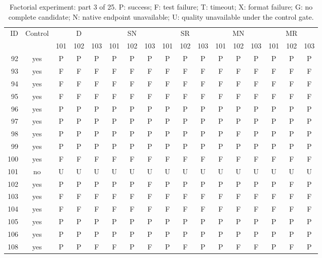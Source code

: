 \begin{table}[p]\centering\footnotesize
\setlength{\tabcolsep}{3pt}
\caption{Factorial experiment: part 3 of 25. P: success; F: test failure; T: timeout; X: format failure; G: no complete candidate; N: native endpoint unavailable; U: quality unavailable under the control gate.}
\begin{tabular*}{\textwidth}{@{\extracolsep{\fill}}rcccccccccccccccc}\toprule
ID & Control & \multicolumn{3}{c}{D} & \multicolumn{3}{c}{SN} & \multicolumn{3}{c}{SR} & \multicolumn{3}{c}{MN} & \multicolumn{3}{c}{MR}\\
\cmidrule(lr){3-5}\cmidrule(lr){6-8}\cmidrule(lr){9-11}\cmidrule(lr){12-14}\cmidrule(lr){15-17}
 & & 101 & 102 & 103 & 101 & 102 & 103 & 101 & 102 & 103 & 101 & 102 & 103 & 101 & 102 & 103\\\midrule
92 & yes & P & P & P & P & P & P & P & P & P & P & P & P & P & P & P\\
93 & yes & F & F & F & F & F & F & F & F & F & F & F & F & F & F & F\\
94 & yes & F & F & F & F & F & F & F & F & F & F & F & F & F & F & F\\
95 & yes & F & F & F & F & F & F & F & F & F & F & F & F & F & F & F\\
96 & yes & P & P & P & P & P & P & P & P & P & P & P & P & P & P & P\\
97 & yes & P & P & P & P & P & P & P & P & P & P & P & P & P & P & P\\
98 & yes & P & P & P & P & P & P & P & P & P & P & F & P & P & P & P\\
99 & yes & P & P & P & P & P & P & P & P & P & P & P & P & P & P & P\\
100 & yes & F & F & F & F & F & F & F & F & F & F & F & F & F & F & F\\
101 & no & U & U & U & U & U & U & U & U & U & U & U & U & U & U & U\\
102 & yes & P & P & P & P & P & F & P & P & P & P & P & P & P & F & P\\
103 & yes & F & F & F & F & F & F & F & F & F & F & F & F & F & F & F\\
104 & yes & F & F & F & F & F & F & F & F & F & F & F & F & F & F & F\\
105 & yes & P & P & P & P & P & P & P & P & P & P & P & P & P & P & P\\
106 & yes & P & P & P & P & P & P & P & P & P & P & P & P & P & P & P\\
108 & yes & P & P & F & F & P & F & P & F & P & P & F & F & P & F & P\\

\end{tabular*}
\end{table}
